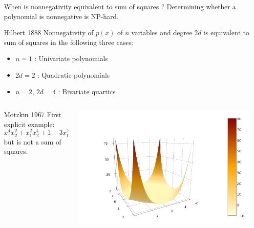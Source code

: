 \documentclass{beamer}
\begin{document}
  \begin{frame}{When is nonnegativity equivalent to sum of squares ?}
    Determining whether a polynomial is nonnegative is \alert{NP-hard}.
    \begin{block}{Hilbert 1888}
      Nonnegativity of $p(x)$ of $n$ variables and degree $2d$ is equivalent to sum of squares in the following three cases:
      \begin{itemize}
        \item $n = 1$ : Univariate polynomials
        \item $2d = 2$ : Quadratic polynomials
        \item $n = 2$, $2d = 4$ : Bivariate quartics
      \end{itemize}
    \end{block}
    \begin{columns}
      \begin{column}{0.7\textwidth}
    \begin{block}{Motzkin 1967}
      First \alert{explicit} example:
      \[ x_1^4x_2^2 + x_1^2x_2^4 + 1 - 3x_1^2x_2^2 \geq 0 \quad \forall x \]
      but is \alert{not} a sum of squares.
    \end{block}
      \end{column}
      \begin{column}{0.3\textwidth}
        \centering
        \includegraphics[trim=3cm .7cm 6cm 3cm, clip, width=\textwidth]{motzkin.png}
      \end{column}
    \end{columns}
  \end{frame}
\end{document}
